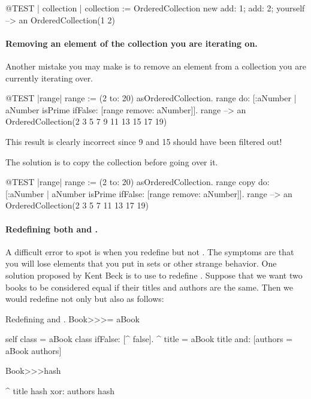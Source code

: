 \documentclass[a4paper,10pt,twoside]{book}
\begin{document}
\begin{code}{@TEST | collection |}
collection := OrderedCollection new add: 1; add: 2; yourself --> an OrderedCollection(1 2)
\end{code}

\paragraph{Removing an element of the collection you are iterating on.}
Another mistake you may make is to remove an element from a collection you are currently iterating over.
\begin{code}{@TEST |range|}
range := (2 to: 20) asOrderedCollection.
range do: [:aNumber | aNumber isPrime ifFalse: [range remove: aNumber]].
range --> an OrderedCollection(2 3 5 7 9 11 13 15 17 19)
\end{code}
\noindent
This result is clearly incorrect since 9 and 15 should have been filtered out!

The solution is to copy the collection before going over it.
\begin{code}{@TEST |range|}
range := (2 to: 20) asOrderedCollection.
range copy do: [:aNumber | aNumber isPrime ifFalse: [range remove: aNumber]].
range --> an OrderedCollection(2 3 5 7 11 13 17 19)
\end{code}

\paragraph{Redefining both \ct{=} and .}
A difficult error to spot is when you redefine \ct{=} but not .
The symptoms are that you will lose elements that you put in sets or other strange behavior.
One solution proposed by Kent Beck is to use  to redefine .
Suppose that we want two books to be considered equal if their titles and authors are the same.
Then we would redefine not only \ct{=} but also  as follows:

\begin{method}{Redefining \lct{=} and .}
Book>>>= aBook

   self class = aBook class ifFalse: [^ false].
   ^ title = aBook title and: [authors = aBook authors]


Book>>>hash

   ^ title hash xor: authors hash
\end{method}
\end{document}
